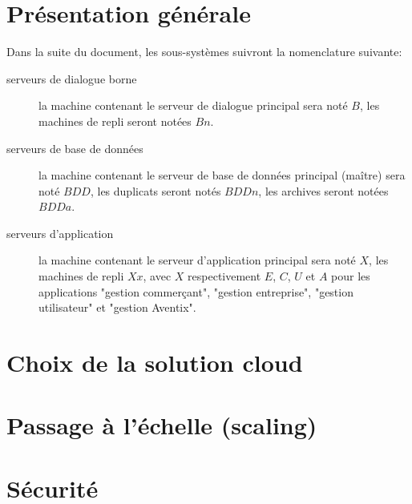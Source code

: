 




\section{Présentation générale}

Dans la suite du document, les sous-systèmes suivront la nomenclature suivante:

\begin{description}
    \item[serveurs de dialogue borne] la machine contenant le serveur de
        dialogue principal sera noté $B$, les machines de repli seront notées
        $Bn$.
    \item[serveurs de base de données] la machine contenant le serveur de base
        de données principal (maître) sera noté $BDD$, les duplicats seront
        notés $BDDn$, les archives seront notées $BDDa$.
    \item[serveurs d'application] la machine contenant le serveur d'application
        principal sera noté $X$, les machines de repli $Xx$, avec $X$
        respectivement $E$, $C$, $U$ et $A$ pour les applications "gestion
        commerçant", "gestion entreprise", "gestion utilisateur" et "gestion
        Aventix".
\end{description}

\section{Choix de la solution cloud}
\section{Passage à l'échelle (scaling)}
\section{Sécurité}


